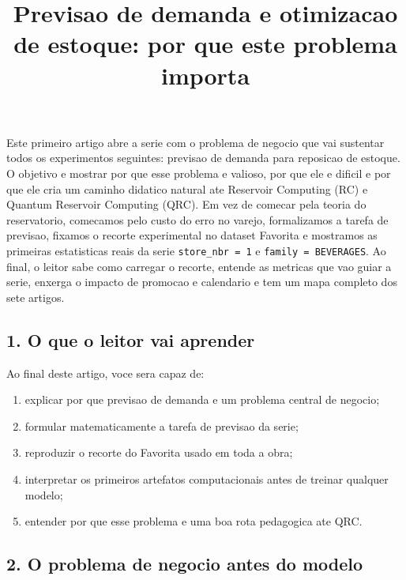 \documentclass[12pt]{article}
\title{Previsao de demanda e otimizacao de estoque: por que este problema importa}
\author{}
\providecommand{\tightlist}{%
          \setlength{\itemsep}{0pt}\setlength{\parskip}{0pt}}
\begin{document}
        \maketitle

        \begin{resumo}
        Este primeiro artigo abre a serie com o problema de negocio que vai sustentar todos os experimentos seguintes: previsao de demanda para reposicao de estoque. O objetivo e mostrar por que esse problema e valioso, por que ele e dificil e por que ele cria um caminho didatico natural ate Reservoir Computing (RC) e Quantum Reservoir Computing (QRC). Em vez de comecar pela teoria do reservatorio, comecamos pelo custo do erro no varejo, formalizamos a tarefa de previsao, fixamos o recorte experimental no dataset Favorita e mostramos as primeiras estatisticas reais da serie \texttt{store\_nbr\ =\ 1} e \texttt{family\ =\ BEVERAGES}. Ao final, o leitor sabe como carregar o recorte, entende as metricas que vao guiar a serie, enxerga o impacto de promocao e calendario e tem um mapa completo dos sete artigos.
        \end{resumo}

        \subsection{1. O que o leitor vai aprender}\label{1-o-que-o-leitor-vai-aprender}

Ao final deste artigo, voce sera capaz de:

\begin{enumerate}
\def\labelenumi{\arabic{enumi}.}
\tightlist
\item
  explicar por que previsao de demanda e um problema central de negocio;
\item
  formular matematicamente a tarefa de previsao da serie;
\item
  reproduzir o recorte do Favorita usado em toda a obra;
\item
  interpretar os primeiros artefatos computacionais antes de treinar qualquer modelo;
\item
  entender por que esse problema e uma boa rota pedagogica ate QRC.
\end{enumerate}

\subsection{2. O problema de negocio antes do modelo}\label{2-o-problema-de-negocio-antes-do-modelo}
\end{document}
